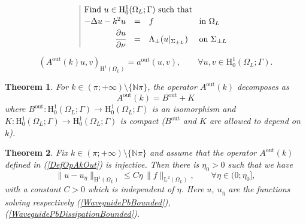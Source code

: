 \documentclass[10pt,a4paper]{amsart}
\newtheorem{theorem}{Theorem}
\newcommand{\N}{\mathbb{N}}
\newcommand{\Om}{\Omega}
\newcommand{\mH}{\mrm{H}}
\newcommand{\mL}{\mrm{L}}
\newcommand{\mrm}[1]{\mathrm{#1}}
\begin{document}
\begin{equation}\label{WaveguidePbBounded}
\begin{array}{|rcll}
\multicolumn{4}{|l}{\mbox{Find }u\in\mH^1_0(\Om_L;\Gamma)\mbox{ such that }}\\[2pt]
-\Delta u-k^2u&=&f&\mbox{ in }\Om_L \\[2pt]
\cfrac{\partial u}{\partial \nu} & = & \Lambda_\pm(u|_{\Sigma_{\pm L}}) &\mbox{ on }\Sigma_{\pm L}
\end{array}
\end{equation} 

\begin{equation}\label{DefOpAkOut}
(A^{\mrm{out}}(k)u,v)_{\mH^1(\Om_L)} =a^{\mrm{out}}(u,v),\qquad\forall u,v\in \mH^1_0(\Om_L;\Gamma).
\end{equation}

\begin{theorem}\label{ThmFredholm}
For $k\in(\pi;+\infty)\setminus\{\N\pi\}$, the operator $A^{\mrm{out}}(k)$ decomposes as 
\[
A^{\mrm{out}}(k)=B^{\mrm{out}}+K
\]
where $B^{\mrm{out}}:\mH^1_0(\Om_L;\Gamma)\to\mH^1_0(\Om_L;\Gamma)$ is an isomorphism and $K:\mH^1_0(\Om_L;\Gamma)\to\mH^1_0(\Om_L;\Gamma)$ is compact ($B^{\mrm{out}}$ and $K$ are allowed to depend on $k$).
\end{theorem}

\begin{theorem}
Fix $k\in(\pi;+\infty)\setminus\{\N\pi\}$ and assume that the operator $A^{\mrm{out}}(k)$ defined in (\ref{DefOpAkOut}) is injective. Then there is $\eta_0>0$ such that we have
\[
\|u-u_\eta\|_{\mH^1(\Om_L)} \le C\eta\,\|f\|_{\mL^2(\Om_L)},\qquad \forall \eta\in(0;\eta_0],
\]
with a constant $C>0$ which is independent of $\eta$. Here $u$, $u_\eta$ are the functions solving respectively (\ref{WaveguidePbBounded}), (\ref{WaveguidePbDissipationBounded}).
\end{theorem}
\end{document}
